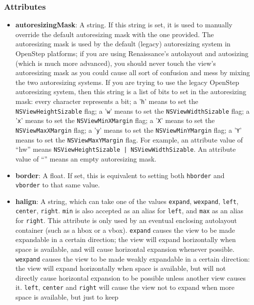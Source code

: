 \subsubsection{Attributes}
\begin{itemize}
\item {\bf autoresizingMask}:  A string.  If this string is set, it is
used to manually override the default autoresizing mask with the one
provided.  The autoresizing mask is used by the default (legacy)
autoresizing system in OpenStep platforms; if you are using
Renaissance's autolayout and autosizing (which is much more advanced),
you should never touch the view's autoresizing mask as you could cause
all sort of confusion and mess by mixing the two autoresizing systems.
If you are trying to use the legacy OpenStep autoresizing system, then
this string is a list of bits to set in the autoresizing mask: every
character represents a bit; a '\texttt{h}' means to set the
\texttt{NSViewHeightSizable} flag; a '\texttt{w}' means to set the
\texttt{NSViewWidthSizable} flag; a '\texttt{x}' means to set the 
\texttt{NSViewMinXMargin} flag; a '\texttt{X}' means to set the
\texttt{NSViewMaxXMargin} flag; a '\texttt{y}' means to set the 
\texttt{NSViewMinYMargin} flag; a '\texttt{Y}' means to set the
\texttt{NSViewMaxYMargin} flag.  For example, an attribute value of
``hw'' means \texttt{NSViewHeightSizable | NSViewWidthSizable}.  An
attribute value of ``'' means an empty autoresizing mask.
\item {\bf border}: A float.  If set, this is equivalent to setting
both \texttt{hborder} and \texttt{vborder} to that same value.
\item {\bf halign}: A string, which can take one of the values 
\texttt{expand}, \texttt{wexpand}, \texttt{left}, \texttt{center},
\texttt{right}.  \texttt{min} is also accepted as an alias for 
\texttt{left}, and \texttt{max} as an alias for \texttt{right}.  This
attribute is only used by an eventual enclosing autolayout container
(such as a hbox or a vbox).  \texttt{expand} causes the view to be
made expandable in a certain direction; the view will expand
horizontally when space is available, and will cause horizontal
expansion whenever possible.  \texttt{wexpand} causes the view to be
made weakly expandable in a certain direction: the view will expand
horizontally when space is available, but will not directly cause
horizontal expansion to be possible unless another view causes it.
\texttt{left}, \texttt{center} and \texttt{right} will cause 
the view not to expand when more space is available, but just to keep

\end{itemize}
